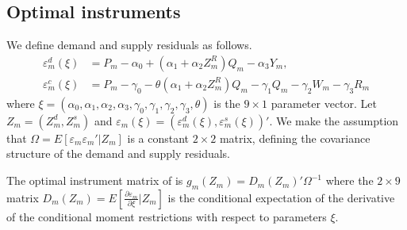 \documentclass[11pt, a4paper]{article}
\begin{document}
\subsection{Optimal instruments}
We define demand and supply residuals as follows.
\begin{align*}
    \varepsilon^{d}_{m}(\xi) &= P_m - \alpha_0 + (\alpha_1 + \alpha_2Z^{R}_{m})Q_{m} - \alpha_3 Y_m,\\
    \varepsilon^c_m(\xi) &= P_{m} - \gamma_0 - \theta (\alpha_1 + \alpha_2 Z^{R}_m)Q_{m} - \gamma_1 Q_{m} - \gamma_2 W_m - \gamma_3 R_{m}
\end{align*}
where $\xi=\left(\alpha_0, \alpha_1, \alpha_2, \alpha_3, \gamma_0, \gamma_1, \gamma_2, \gamma_3, \theta\right)$ is the $9\times 1$ parameter vector. 
Let $Z_{m}=(Z_{m}^{d},Z_{m}^{s})$ and $\varepsilon_{m}(\xi)=(\varepsilon_{m}^{d}(\xi),\varepsilon_{m}^{s}(\xi))'$.
We make the assumption that $\Omega=E[\varepsilon_{m}\varepsilon_{m}'|Z_{m}]$ is a constant $2\times 2$ matrix, defining the covariance structure of the demand and supply residuals.
 
The optimal instrument matrix of \cite{chamberlain1987asymptotic} is $g_{m}(Z_{m})=D_{m}(Z_{m})'\Omega^{-1}$
where the $2\times 9$ matrix $D_{m}(Z_{m})=E\left[\frac{\partial \varepsilon_{m}}{\partial \xi}| Z_{m}\right]$ is the conditional expectation of the derivative of the conditional moment restrictions with respect to parameters $\xi$. 
\end{document}
